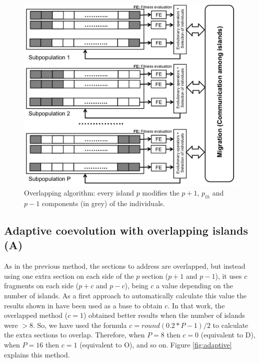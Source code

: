 \documentclass[preprint]{elsarticle}
\begin{document}
\begin{figure}
\centering
\includegraphics[width=12cm]{islandNoDisjoint.jpg}
\caption{Overlapping algorithm: every island $p$ modifies the  $p+1$,
  $p_{th}$ and $p-1$  components (in grey) of the individuals.}
  \label{fig:overlapping}
\end{figure}

\subsection{Adaptive coevolution with overlapping islands (A)} 
As in the previous method, the sections to address are overlapped, but instead using one extra section on each side of the $p$ section ($p+1$ and $p-1$), it uses $c$ fragments on each side ($p+c$ and $p-c$), being $c$ a value depending on the number of islands. As a first approach to automatically calculate this value the results shown in \citep{Garcia16hpmoon} have been used as a base to obtain $c$. In that work, the overlapped method ($c=1$) obtained better results when the number of islands were $>$8. So, we have used the formula $c=round(0.2*P-1)/2$ to calculate the extra sections to overlap. Therefore, when $P=8$ then $c=0$ (equivalent to D), when $P=16$ then $c=1$ (equivalent to O), and so on. Figure \ref{fig:adaptive} explains this method.
\end{document}
